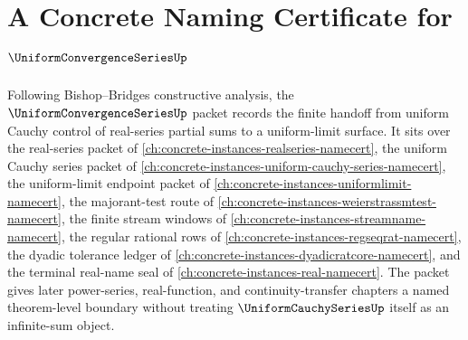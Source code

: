 \chapter{A Concrete Naming Certificate for $\UniformConvergenceSeriesUp$}
\label{ch:concrete-instances-uniform-convergence-series-namecert}

Following Bishop--Bridges constructive analysis, the $\UniformConvergenceSeriesUp$ packet records the finite handoff from uniform Cauchy control of real-series partial sums to a uniform-limit surface. It sits over the real-series packet of \autoref{ch:concrete-instances-realseries-namecert}, the uniform Cauchy series packet of \autoref{ch:concrete-instances-uniform-cauchy-series-namecert}, the uniform-limit endpoint packet of \autoref{ch:concrete-instances-uniformlimit-namecert}, the majorant-test route of \autoref{ch:concrete-instances-weierstrassmtest-namecert}, the finite stream windows of \autoref{ch:concrete-instances-streamname-namecert}, the regular rational rows of \autoref{ch:concrete-instances-regseqrat-namecert}, the dyadic tolerance ledger of \autoref{ch:concrete-instances-dyadicratcore-namecert}, and the terminal real-name seal of \autoref{ch:concrete-instances-real-namecert}. The packet gives later power-series, real-function, and continuity-transfer chapters a named theorem-level boundary without treating $\UniformCauchySeriesUp$ itself as an infinite-sum object.

